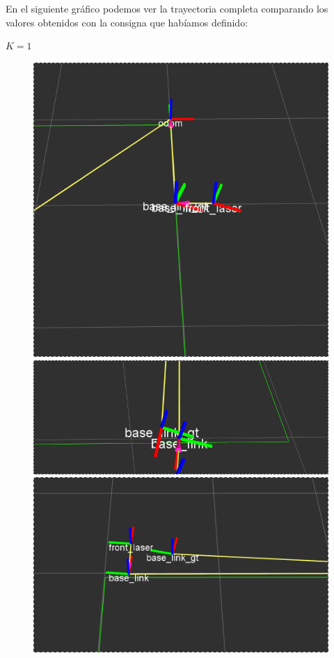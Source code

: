 En el siguiente gráfico podemos ver la trayectoria completa comparando los valores obtenidos con la consigna que habíamos definido:


$K = 1$


\begin{figure}[!htb]
  \includegraphics[width=\linewidth]{imagenesExpLazoCerrado/k1/1.png}
\endminipage\hfill
{}
  \includegraphics[width=\linewidth]{imagenesExpLazoCerrado/k1/3.png}
\endminipage\hfill
{}%
  \includegraphics[width=\linewidth]{imagenesExpLazoCerrado/k1/5.png}
\endminipage
\end{figure}

